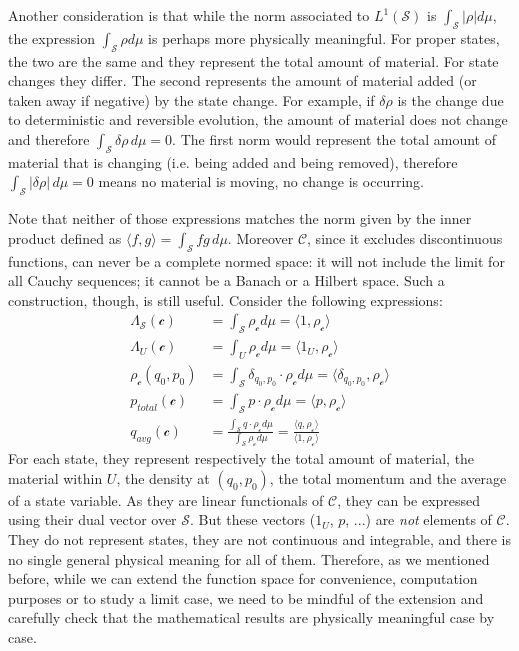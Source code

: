 \documentclass[aps,pra,10pt,twocolumn,floatfix,nofootinbib]{revtex4-1}
\numberwithin{equation}{section}
\theoremstyle{definition}
\begin{document}
Another consideration is that while the norm associated to $L^1(\mathcal{S})$ is $\int_{\mathcal{S}} |\rho| d\mu$, the expression $\int_{\mathcal{S}} \rho d\mu$ is perhaps more physically meaningful. For proper states, the two are the same and they represent the total amount of material. For state changes they differ. The second represents the amount of material added (or taken away if negative) by the state change. For example, if $\delta \rho$ is the change due to deterministic and reversible evolution, the amount of material does not change and therefore $\int_{\mathcal{S}} \delta \rho \, d\mu = 0$. The first norm would represent the total amount of material that is changing (i.e. being added and being removed), therefore $\int_{\mathcal{S}} | \delta \rho | \, d\mu = 0$ means no material is moving, no change is occurring.

Note that neither of those expressions matches the norm given by the inner product defined as $\langle f, g \rangle = \int_{\mathcal{S}} fg \, d\mu$. Moreover $\mathcal{C}$, since it excludes discontinuous functions, can never be a complete normed space: it will not include the limit for all Cauchy sequences; it cannot be a Banach or a Hilbert space. Such a construction, though, is still useful. Consider the following expressions:
\begin{align*}
\Lambda_{\mathcal{S}} (\mathcal{c}) &= \int_\mathcal{S} \rho_{\mathcal{c}} d \mu = \langle 1 , \rho_{\mathcal{c}} \rangle \\
\Lambda_U (\mathcal{c}) &= \int_U \rho_{\mathcal{c}} d \mu = \langle 1_U , \rho_{\mathcal{c}} \rangle \\
\rho_\mathcal{c}(q_0,p_0) &= \int_\mathcal{S} \delta_{q_0,p_0} \cdot \rho_{\mathcal{c}} d \mu = \langle \delta_{q_0,p_0} , \rho_{\mathcal{c}} \rangle \\
p_{total}(\mathcal{c}) &= \int_\mathcal{S} p \cdot \rho_{\mathcal{c}} d \mu = \langle p , \rho_{\mathcal{c}} \rangle \\
q_{avg}(\mathcal{c}) &= \frac{\int_\mathcal{S} q \cdot \rho_{\mathcal{c}} d \mu}{\int_\mathcal{S} \rho_{\mathcal{c}} d \mu} = \frac{\langle q , \rho_{\mathcal{c}} \rangle}{\langle 1 , \rho_{\mathcal{c}} \rangle}
\end{align*}
For each state, they represent respectively the total amount of material, the material within $U$, the density at $(q_0, p_0)$, the total momentum and the average of a state variable. As they are linear functionals of $\mathcal{C}$,  they can be expressed using their dual vector over $\mathcal{S}$. But these vectors ($1_U$, $p$, ...) are \emph{not} elements of $\mathcal{C}$. They do not represent states, they are not continuous and integrable, and there is no single general physical meaning for all of them. Therefore, as we mentioned before, while we can extend the function space for convenience, computation purposes or to study a limit case, we need to be mindful of the extension and carefully check that the mathematical results are physically meaningful case by case.
\end{document}
